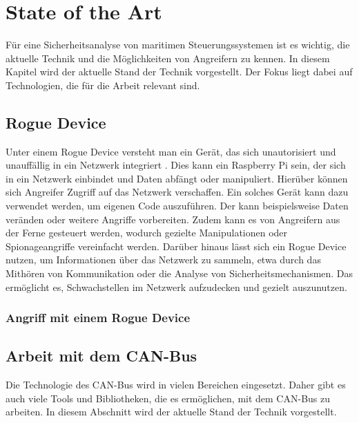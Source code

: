 \chapter{State of the Art}

Für eine Sicherheitsanalyse von maritimen Steuerungssystemen ist es wichtig, die aktuelle Technik und die
Möglichkeiten von Angreifern zu kennen. In diesem Kapitel wird der aktuelle Stand der Technik vorgestellt.
Der Fokus liegt dabei auf Technologien, die für die Arbeit relevant sind.

\section{Rogue Device}
Unter einem Rogue Device versteht man ein Gerät, das sich unautorisiert und unauffällig in ein Netzwerk integriert \cite{Scarfone2008}.
Dies kann ein Raspberry Pi sein, der sich in ein Netzwerk einbindet und Daten abfängt oder manipuliert. Hierüber können 
sich Angreifer Zugriff auf das Netzwerk verschaffen. 
Ein solches Gerät kann dazu verwendet werden, um eigenen Code auszuführen. Der kann beispielsweise Daten veränden oder 
weitere Angriffe vorbereiten. Zudem kann es von Angreifern aus der Ferne gesteuert werden, wodurch gezielte 
Manipulationen oder Spionageangriffe vereinfacht werden. Darüber hinaus lässt sich ein Rogue Device nutzen, um Informationen 
über das Netzwerk zu sammeln, etwa durch das Mithören von Kommunikation oder die Analyse von Sicherheitsmechanismen.
Das ermöglicht es, Schwachstellen im Netzwerk aufzudecken und gezielt auszunutzen.

\subsection{Angriff mit einem Rogue Device}

\section{Arbeit mit dem CAN-Bus}
Die Technologie des CAN-Bus wird in vielen Bereichen eingesetzt.
Daher gibt es auch viele Tools und Bibliotheken, die es ermöglichen, mit dem CAN-Bus zu arbeiten.
In diesem Abschnitt wird der aktuelle Stand der Technik vorgestellt.

